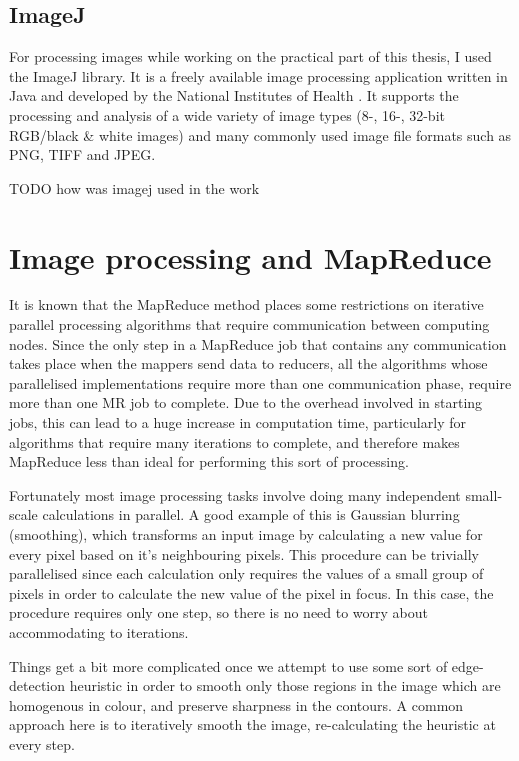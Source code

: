 \documentclass [12pt,a4paper]{report}
\begin{document}
\subsection{ImageJ}
For processing images while working on the practical part of this thesis, I used the ImageJ library. It is a freely available image processing application written in Java and developed by the National Institutes of Health \cite{imagej}. It supports the processing and analysis of a wide variety of image types (8-, 16-, 32-bit RGB/black \& white images) and many commonly used image file formats such as PNG, TIFF and JPEG.

TODO how was imagej used in the work

\section{Image processing and MapReduce}

It is known that the MapReduce method places some restrictions on iterative parallel processing algorithms that require communication between computing nodes. Since the only step in a MapReduce job that contains any communication takes place when the mappers send data to reducers, all the algorithms whose parallelised implementations require more than one communication phase, require more than one MR job to complete. Due to the overhead involved in starting jobs, this can lead to a huge increase in computation time, particularly for algorithms that require many iterations to complete, and therefore makes MapReduce less than ideal for performing this sort of processing.

Fortunately most image processing tasks involve doing many independent small-scale calculations in parallel. A good example of this is Gaussian blurring (smoothing), which transforms an input image by calculating a new value for every pixel based on it's neighbouring pixels. This procedure can be trivially parallelised since each calculation only requires the values of a small group of pixels in order to calculate the new value of the pixel in focus. In this case, the procedure requires only one step, so there is no need to worry about accommodating to iterations.

Things get a bit more complicated once we attempt to use some sort of edge-detection heuristic in order to smooth only those regions in the image which are homogenous in colour, and preserve sharpness in the contours. A common approach here is to iteratively smooth the image, re-calculating the heuristic at every step. 
\end{document}
